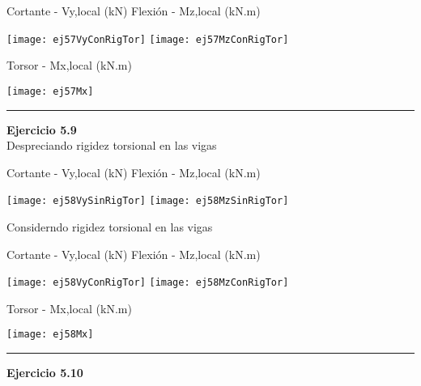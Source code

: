 \noindent
Cortante - Vy,local (kN)
\hfill
Flexión - Mz,local (kN.m)


\texttt{[image: ej57VyConRigTor]}
\texttt{[image: ej57MzConRigTor]}

\begin{center}
	
	Torsor - Mx,local (kN.m)
	
	\texttt{[image: ej57Mx]}
	
\end{center}





\hrule
\vspace{5mm}
\textbf{Ejercicio 5.9}\\


Despreciando rigidez torsional en las vigas

\noindent
Cortante - Vy,local (kN)
\hfill
Flexión - Mz,local (kN.m)

\texttt{[image: ej58VySinRigTor]}
\texttt{[image: ej58MzSinRigTor]}


Considerndo rigidez torsional en las vigas


\noindent
Cortante - Vy,local (kN)
\hfill
Flexión - Mz,local (kN.m)


\texttt{[image: ej58VyConRigTor]}
\texttt{[image: ej58MzConRigTor]}

\begin{center}
	
	Torsor - Mx,local (kN.m)
	
	\texttt{[image: ej58Mx]}
	
\end{center}



\hrule
\vspace{5mm}
\textbf{Ejercicio 5.10}\\

\vspace{5mm}



